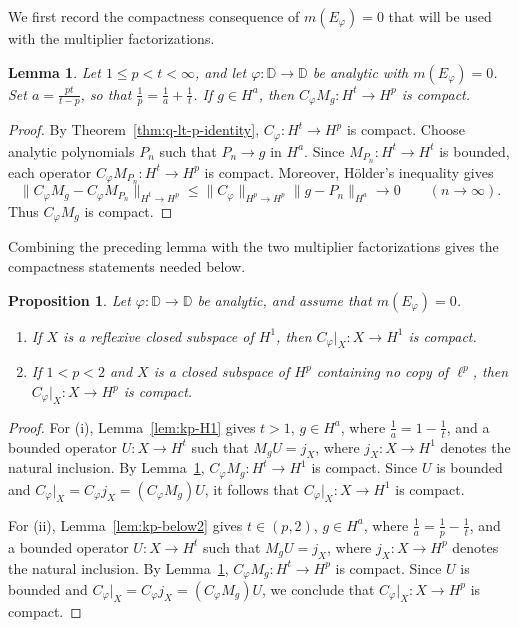 \documentclass[11pt, reqno]{amsart}
\newtheorem{lemma}[theorem]{Lemma}
\newtheorem{proposition}[theorem]{Proposition}
\theoremstyle{definition}
\theoremstyle{remark}
\newcommand{\D}{\mathbb{D}}
\begin{document}
We first record the compactness consequence of
\(m(E_\varphi)=0\) that will be used with the multiplier
factorizations.

\begin{lemma}
\label{lem:diag-compact}
Let \(1\le p<t<\infty\), and let \(\varphi:\D\to\D\) be analytic
with \(m(E_\varphi)=0\). Set \(a=\frac{pt}{t-p}\), so that
\(\frac1 p=\frac1 a+\frac1 t\). If \(g\in H^a\), then
\(C_\varphi M_g:H^t\to H^p\) is compact.
\end{lemma}

\begin{proof}
By Theorem~\ref{thm:q-lt-p-identity},
\(C_\varphi:H^t\to H^p\) is compact. Choose analytic polynomials
\(P_n\) such that \(P_n\to g\) in \(H^a\). Since
\(M_{P_n}:H^t\to H^t\) is bounded, each operator
\(C_\varphi M_{P_n}:H^t\to H^p\) is compact. Moreover, H\"older's
inequality gives
\[
        \|C_\varphi M_g-C_\varphi M_{P_n}\|_{H^t\to H^p}
        \le
        \|C_\varphi\|_{H^p\to H^p}
        \|g-P_n\|_{H^a}
       \longrightarrow 0 \qquad (n\to\infty).
\]
Thus \(C_\varphi M_g\) is compact.
\end{proof}
Combining the preceding lemma with the two multiplier factorizations
gives the compactness statements needed below.

\begin{proposition}
\label{prop:diag-compact}
Let \(\varphi:\D\to\D\) be analytic, and assume that
\(m(E_\varphi)=0\).
\begin{enumerate}[label=\textup{(\roman*)}]
\item If \(X\) is a reflexive closed subspace of \(H^1\), then
\(C_\varphi|_X:X\to H^1\) is compact.
\item If \(1<p<2\) and \(X\) is a closed subspace of \(H^p\)
containing no copy of \(\ell^p\), then
\(C_\varphi|_X:X\to H^p\) is compact.
\end{enumerate}
\end{proposition}

\begin{proof}
For \textup{(i)},
Lemma~\ref{lem:kp-H1} gives \(t>1\),
\(g\in H^a\), where \(\frac1 a=1-\frac1 t\), and a bounded operator
\(U:X\to H^t\) such that \(M_gU=j_X\), where
\(j_X:X\to H^1\) denotes the natural inclusion. By
Lemma~\ref{lem:diag-compact},
\(C_\varphi M_g:H^t\to H^1\) is compact. Since \(U\) is bounded and
\(C_\varphi|_X=C_\varphi j_X=(C_\varphi M_g)U\),
it follows that \(C_\varphi|_X:X\to H^1\) is compact.

For \textup{(ii)},
Lemma~\ref{lem:kp-below2} gives \(t\in(p,2)\),
\(g\in H^a\), where \(\frac1 a=\frac1 p-\frac1 t\), and a bounded operator
\(U:X\to H^t\) such that \(M_gU=j_X\), where
\(j_X:X\to H^p\) denotes the natural inclusion. By
Lemma~\ref{lem:diag-compact},
\(C_\varphi M_g:H^t\to H^p\) is compact. Since \(U\) is bounded and
\(C_\varphi|_X=C_\varphi j_X=(C_\varphi M_g)U\),
we conclude that \(C_\varphi|_X:X\to H^p\) is compact.
\end{proof}
\end{document}
